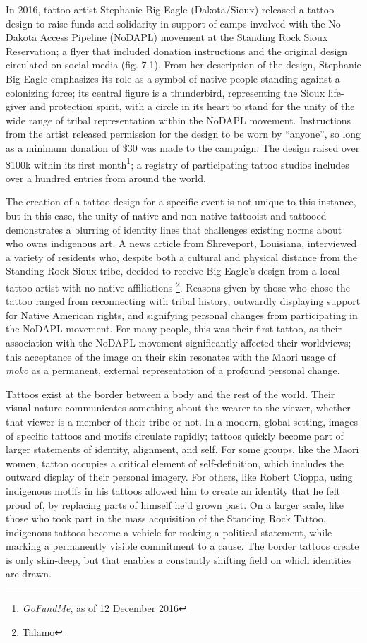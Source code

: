In 2016, tattoo artist Stephanie Big Eagle (Dakota/Sioux) released a tattoo
design to raise funds and solidarity in support of camps involved with the No
Dakota Access Pipeline (NoDAPL) movement at the Standing Rock Sioux Reservation;
a flyer that included donation instructions and the original design circulated
on social media (fig. 7.1). From her description of the design, Stephanie Big
Eagle emphasizes its role as a symbol of native people standing against a
colonizing force; its central figure is a thunderbird, representing the Sioux
life-giver and protection spirit, with a circle in its heart to stand for the
unity of the wide range of tribal representation within the NoDAPL movement.
Instructions from the artist released permission for the design to be worn by
``anyone'', so long as a minimum donation of \$30 was made to the campaign.  The
design raised over \$100k within its first month\footnote{\textit{GoFundMe}, as
of 12 December 2016}; a registry of participating tattoo studios includes over a
hundred entries from around the world.

The creation of a tattoo design for a specific event is not unique to this
instance, but in this case, the unity of native and non-native tattooist and
tattooed demonstrates a blurring of identity lines that challenges existing
norms about who owns indigenous art. A news article from Shreveport, Louisiana,
interviewed a variety of residents who, despite both a cultural and physical
distance from the Standing Rock Sioux tribe, decided to receive Big Eagle's
design from a local tattoo artist with no native affiliations \footnote{Talamo}.
Reasons given by those who chose the tattoo ranged from reconnecting with tribal
history, outwardly displaying support for Native American rights, and signifying
personal changes from participating in the NoDAPL movement. For many people,
this was their first tattoo, as their association with the NoDAPL movement
significantly affected their worldviews; this acceptance of the image on their
skin resonates with the Maori usage of \textit{moko} as a permanent, external
representation of a profound personal change.

Tattoos exist at the border between a body and the rest of the world. Their
visual nature communicates something about the wearer to the viewer, whether
that viewer is a member of their tribe or not. In a modern, global setting,
images of specific tattoos and motifs circulate rapidly; tattoos quickly become
part of larger statements of identity, alignment, and self. For some groups,
like the Maori women, tattoo occupies a critical element of self-definition,
which includes the outward display of their personal imagery. For others, like
Robert Cioppa, using indigenous motifs in his tattoos allowed him to create an
identity that he felt proud of, by replacing parts of himself he'd grown past.
On a larger scale, like those who took part in the mass acquisition of the
Standing Rock Tattoo, indigenous tattoos become a vehicle for making a political
statement, while marking a permanently visible commitment to a cause. The border
tattoos create is only skin-deep, but that enables a constantly shifting field
on which identities are drawn.
